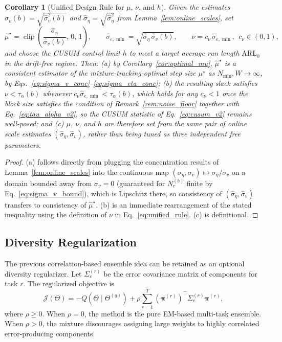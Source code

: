 ﻿\documentclass[12pt,a4paper]{article}
\newtheorem{corollary}{Corollary}
\begin{document}
\begin{corollary}[Unified Design Rule for $\mu$, $\nu$, and $h$]
	\label{cor:unified_design}
	Given the estimates $\hat\sigma_v(b)=\sqrt{\hat\sigma_v^2(b)}$ and
	$\hat\sigma_\eta=\sqrt{\hat\sigma_\eta^2}$ from Lemma~\ref{lem:online_scales},
	set
	\begin{equation}
		\hat\mu^\star = \operatorname{clip}\!\left(\frac{\hat\sigma_\eta}{\hat\sigma_v(b)},\,0,\,1\right),
		\qquad
		\hat\sigma_{e,\min} = \sqrt{\hat\sigma_\eta\,\hat\sigma_v(b)},
		\qquad
		\nu = c_\nu\,\hat\sigma_{e,\min},\ \ c_\nu\in(0,1),
		\label{eq:unified_rule}
	\end{equation}
	and choose the CUSUM control limit $h$ to meet a target average run
	length $\mathrm{ARL}_0$ in the drift-free regime. Then: (a) by
	Corollary~\ref{cor:optimal_mu}, $\hat\mu^\star$ is a consistent estimator
	of the mixture-tracking-optimal step size $\mu^\star$ as
	$N_{\min},W\to\infty$, by Eqs.~\eqref{eq:sigma_v_conc}--\eqref{eq:sigma_eta_conc};
	(b) the resulting slack satisfies $\nu<\tau_\alpha(b)$ whenever
	$c_\nu\hat\sigma_{e,\min}<\tau_\alpha(b)$, which holds for any
	$c_\nu<1$ once the block size satisfies the condition of
	Remark~\ref{rem:noise_floor} together with Eq.~\eqref{eq:tau_alpha_v2},
	so the CUSUM statistic of Eq.~\eqref{eq:cusum_v2} remains
	well-posed; and (c) $\mu$, $\nu$, and $h$ are therefore set from the
	\emph{same} pair of online scale estimates
	$(\hat\sigma_\eta,\hat\sigma_v)$, rather than being tuned as three
	independent free parameters.
\end{corollary}
\begin{proof}
	(a) follows directly from plugging the concentration results of
	Lemma~\ref{lem:online_scales} into the continuous map
	$(\sigma_\eta,\sigma_v)\mapsto\sigma_\eta/\sigma_v$ on a domain bounded
	away from $\sigma_v=0$ (guaranteed for $N_r^{(b)}$ finite by
	Eq.~\eqref{eq:sigma_v_bound}), which is Lipschitz there, so consistency
	of $(\hat\sigma_\eta,\hat\sigma_v)$ transfers to consistency of
	$\hat\mu^\star$. (b) is an immediate rearrangement of the stated
	inequality using the definition of $\nu$ in Eq.~\eqref{eq:unified_rule}.
	(c) is definitional.
\end{proof}

\subsection{Diversity Regularization}
The previous correlation-based ensemble idea can be retained as an optional
diversity regularizer. Let $\Sigma_e^{(r)}$ be the error covariance matrix of
components for task $r$. The regularized objective is
\begin{equation}
\mathcal{J}(\Theta)=
-Q(\Theta\mid\Theta^{(q)})+
\rho\sum_{r=1}^{T}(\bm{\pi}^{(r)})^\top\Sigma_e^{(r)}\bm{\pi}^{(r)},
\label{eq:diversity_regularized_objective}
\end{equation}
where $\rho\geq0$. When $\rho=0$, the method is the pure EM-based multi-task
ensemble. When $\rho>0$, the mixture discourages assigning large weights to
highly correlated error-producing components.
\end{document}
